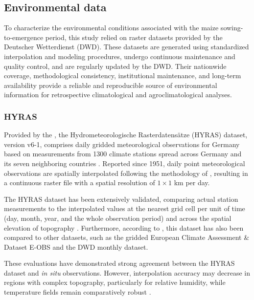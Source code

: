 \documentclass[10pt,authoryear]{elsarticle}
\begin{document}
{		\subsection{Environmental data}
		
		To characterize the environmental conditions associated with the maize sowing-to-emergence period, this study relied on raster datasets provided by the Deutscher Wetterdienst (DWD). These datasets are generated using standardized interpolation and modeling procedures, undergo continuous maintenance and quality control, and are regularly updated by the DWD. Their nationwide coverage, methodological consistency, institutional maintenance, and long-term availability provide a reliable and reproducible source of environmental information for retrospective climatological and agroclimatological analyses.
		
		
		
		\subsubsection{HYRAS}
		
		Provided by the \cite{DWD_HYRAS_MaxTemp, DWD_HYRAS_MeanTemp, DWD_HYRAS_MinTemp, DWD_HYRAS_Precipitation, DWD_HYRAS_RelHumidity}, the Hydrometeorologische Rasterdatensätze (HYRAS) dataset, version v6-1, comprises daily gridded meteorological observations for Germany based on measurements from 1300 climate stations spread across Germany and its seven neighboring countries \citep{Razafimaharo_2020}. Reported since 1951, daily point meteorological observations are spatially interpolated following the methodology of \cite{Krhenmann_2016}, resulting in a continuous raster file with a spatial resolution of $1\times1$ km per day.
		
		The HYRAS dataset has been extensively validated, comparing actual station measurements to the interpolated values at the nearest grid cell per unit of time (day, month, year, and the whole observation period) and across the spatial elevation of topography \citep{Razafimaharo_2020}. Furthermore, according to \cite{Razafimaharo_2020}, this dataset has also been compared to other datasets, such as the gridded European Climate Assessment \& Dataset E-OBS and the DWD monthly dataset.
		
		These evaluations have demonstrated strong agreement between the HYRAS dataset and \textit{in situ} observations. However, interpolation accuracy may decrease in regions with complex topography, particularly for relative humidity, while temperature fields remain comparatively robust \citep{Razafimaharo_2020}.
		
}
\end{document}

